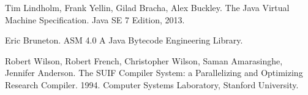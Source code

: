 \begin{thebibliography}{99}
Tim Lindholm, Frank Yellin, Gilad Bracha, Alex Buckley.
The Java Virtual Machine Specification.
Java SE 7 Edition, 2013.

Eric Bruneton.
ASM 4.0 A Java Bytecode Engineering Library.

Robert Wilson, Robert French, Christopher Wilson, Saman Amarasinghe, Jennifer Anderson. The SUIF Compiler System: a Parallelizing and Optimizing Research Compiler. 1994. Computer Systems Laboratory, Stanford University.
\end{thebibliography}
